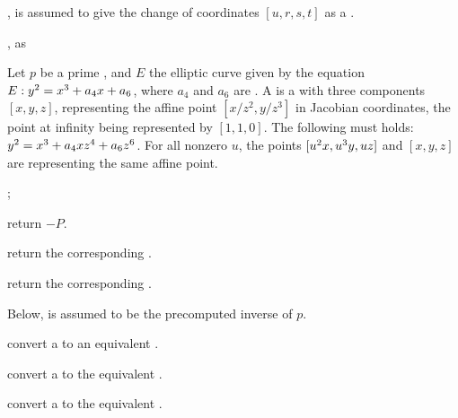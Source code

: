 





,  is assumed
to give the change of coordinates $[u,r,s,t]$ as a .

, as 


Let $p$ be a prime , and $E$ the elliptic curve given by the
equation $E:y^2=x^3+a_4\*x+a_6$, where $a_4$ and $a_6$ are .
A  is a  with three components $[x,y,z]$, representing
the affine point $[x/z^2,y/z^3]$ in Jacobian coordinates, the point at
infinity being represented by $[1, 1, 0]$. The following must holds:
$y^2=x^3+a_4\*x\*z^4+a_6\*z^6$. For all nonzero $u$, the points
$[u^2\*x,u^3\*y,u\*z]$ and $[x,y,z]$ are representing the same affine point.



;

 return $-P$.

 return the corresponding .

 return the corresponding .


Below,  is assumed to be the precomputed inverse of $p$.

 convert a  to an equivalent .

 convert a  to the equivalent
.

 convert a  to the
equivalent .

